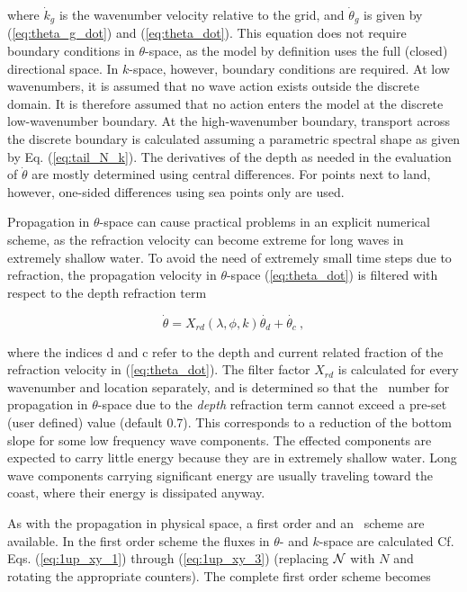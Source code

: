 \noindent
where $\dot{k}_g$ is the wavenumber velocity relative to the grid, and
$\dot{\theta}_g$ is given by (\ref{eq:theta_g_dot}) and (\ref{eq:theta_dot}).
This equation does not require boundary conditions in $\theta$-space, as the
model by definition uses the full (closed) directional space. In $k$-space,
however, boundary conditions are required. At low wavenumbers, it is assumed
that no wave action exists outside the discrete domain. It is therefore
assumed that no action enters the model at the discrete low-wavenumber
boundary. At the high-wavenumber boundary, transport across the discrete
boundary is calculated assuming a parametric spectral shape as given by
Eq. (\ref{eq:tail_N_k}). The derivatives of the depth as needed in the
evaluation of $\dot{\theta}$ are mostly determined using central
differences. For points next to land, however, one-sided differences using sea
points only are used.

Propagation in $\theta$-space can cause practical problems in an explicit
numerical scheme, as the refraction velocity can become extreme for long waves
in extremely shallow water. To avoid the need of extremely small time steps
due to refraction, the propagation velocity in $\theta$-space
(\ref{eq:theta_dot}) is filtered with respect to the depth refraction term


\begin{equation}
\dot{\theta} = X_{rd}(\lambda,\phi,k) \dot{\theta_d} + 
\dot{\theta_c} \: , \label{eq:theta_filter} \end{equation}

\noindent
where the indices d and c refer to the depth and current related fraction of
the refraction velocity in (\ref{eq:theta_dot}). The filter factor $X_{rd}$ is
calculated for every wavenumber and location separately, and is determined so
that the \cfl\ number for propagation in $\theta$-space due to the {\em depth}
refraction term cannot exceed a pre-set (user defined) value (default
0.7). This corresponds to a reduction of the bottom slope for some low
frequency wave components. The effected components are expected to carry
little energy because they are in extremely shallow water. Long wave
components carrying significant energy are usually traveling toward the coast,
where their energy is dissipated anyway.

\vspace{\baselineskip} \noindent 
As with the propagation in physical space, a first order and an \uq\ scheme
are available. In the first order scheme the fluxes in $\theta$- and $k$-space
are calculated Cf. Eqs. (\ref{eq:1up_xy_1}) through (\ref{eq:1up_xy_3})
(replacing ${\cal N}$ with $N$ and rotating the appropriate counters). The complete
first order scheme becomes

